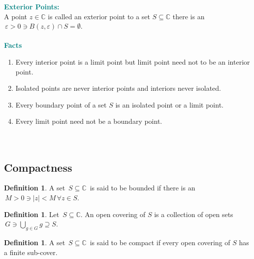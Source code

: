 \documentclass[11pt,a4paper]{article}
\theoremstyle{definition}
\newtheorem{definition}[thm]{Definition}
\begin{document}
\textbf{\textcolor{teal}{Exterior Points:}}\\
A point $z\in \mathbb{C}$ is called an exterior point to a set $S\subseteq \mathbb{C}$ there is an $\, \varepsilon > 0 \ni B(z,\varepsilon) \cap S = \emptyset$.\\\\


\textbf{\textcolor{teal}{Facts}}
\begin{enumerate}
\item Every interior point is a limit point but limit point need not to be an interior point.
\item Isolated points are never interior points and interiors never isolated.
\item Every boundary point of a set $S$ is an isolated point or a limit point.
\item Every limit point need not be a boundary point.\\\\\\
\end{enumerate}












{\color[wave]{485}\subsection{Compactness}}

\begin{definition}
A set $\, S\subseteq \mathbb{C}\,$ is said to be bounded if there is an $\,M > 0 \ni \left|z\right| < M\, \forall z \in S$.
\end{definition}

\begin{definition}
Let $\, S\subseteq \mathbb{C}$. An open covering of $S$ is a collection of open sets $\, G \ni \bigcup\limits_{g \in G}g\supseteq S$.
\end{definition}

\begin{definition}
A set $\, S\subseteq \mathbb{C}\,$ is said to be compact if every open covering of $S$ has a finite sub-cover.
\end{definition}
\end{document}
